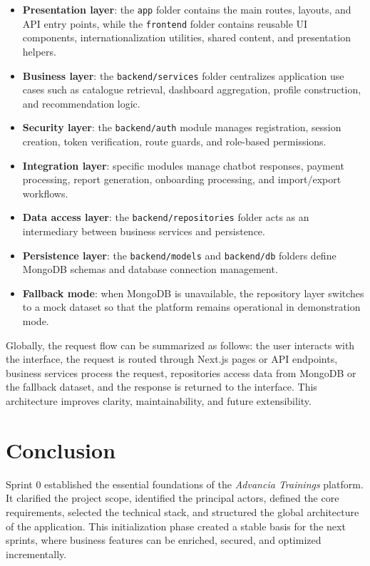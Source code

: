 \begin{itemize}
\item \textbf{Presentation layer}: the \texttt{app} folder contains the main routes, layouts, and API entry points, while the \texttt{frontend} folder contains reusable UI components, internationalization utilities, shared content, and presentation helpers.
\item \textbf{Business layer}: the \texttt{backend/services} folder centralizes application use cases such as catalogue retrieval, dashboard aggregation, profile construction, and recommendation logic.
\item \textbf{Security layer}: the \texttt{backend/auth} module manages registration, session creation, token verification, route guards, and role-based permissions.
\item \textbf{Integration layer}: specific modules manage chatbot responses, payment processing, report generation, onboarding processing, and import/export workflows.
\item \textbf{Data access layer}: the \texttt{backend/repositories} folder acts as an intermediary between business services and persistence.
\item \textbf{Persistence layer}: the \texttt{backend/models} and \texttt{backend/db} folders define MongoDB schemas and database connection management.
\item \textbf{Fallback mode}: when MongoDB is unavailable, the repository layer switches to a mock dataset so that the platform remains operational in demonstration mode.
\end{itemize}

Globally, the request flow can be summarized as follows: the user interacts with the interface, the request is routed through Next.js pages or API endpoints, business services process the request, repositories access data from MongoDB or the fallback dataset, and the response is returned to the interface. This architecture improves clarity, maintainability, and future extensibility.

\section*{Conclusion}
Sprint 0 established the essential foundations of the \textit{Advancia Trainings} platform. It clarified the project scope, identified the principal actors, defined the core requirements, selected the technical stack, and structured the global architecture of the application. This initialization phase created a stable basis for the next sprints, where business features can be enriched, secured, and optimized incrementally.
